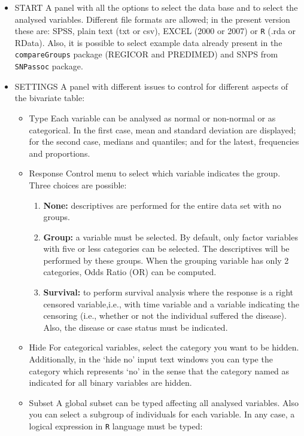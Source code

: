 \documentclass[11pt]{article}
\begin{document}
\begin{itemize}

\item \color{blue} START \color{black} 
   A panel with all the options to select the data base and to select the analysed variables. Different file formats are allowed; in the present version these are: SPSS, plain text (txt or csv), EXCEL (2000 or 2007) or {\tt R} (.rda or RData). Also, it is possible to select example data already present in the {\tt compareGroups} package (REGICOR and PREDIMED) and SNPS from {\tt SNPassoc} package.

\item \color{blue} SETTINGS \color{black}    
   A panel with different issues to control for different aspects of the bivariate table:

	\begin{itemize}
	\item \color{blue} Type \color{black} Each variable can be analysed as normal or non-normal or as categorical. In the first case, mean and standard deviation are displayed; for the second case, medians and quantiles; and for the latest, frequencies and proportions.
	\item \color{blue} Response \color{black} Control menu to select which variable indicates the group. Three choices are possible:
		\begin{enumerate}[1)]
		\item {\bf None:} descriptives are performed for the entire data set with no groups.
		\item {\bf Group:} a variable must be selected. By default, only factor variables with five or less categories can be selected. The descriptives will be performed by these groups. When the grouping variable has only 2 categories, Odds Ratio (OR) can be computed.
		\item {\bf Survival:} to perform survival analysis where the response is a right censored variable,i.e., with time variable and a variable indicating the censoring (i.e., whether or not the individual suffered the disease). Also, the disease or case status must be indicated.
		\end{enumerate}
	\item \color{blue} Hide \color{black} For categorical variables, select the category you want to be hidden. Additionally, in the `hide no' input text windows you can type the category which represents `no' in the sense that the category named as indicated for all binary variables are hidden.
	\item \color{blue} Subset \color{black} A global subset can be typed affecting all analysed variables. Also you can select a subgroup of individuals for each variable. In any case, a logical expression in {\tt R} language must be typed:

\end{itemize}
\end{itemize}
\end{document}
